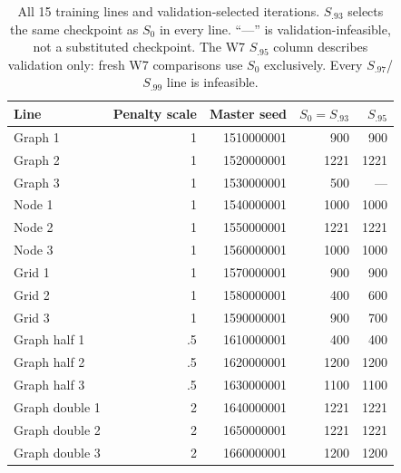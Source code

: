 \begin{table}[htbp]
\centering\small
\caption{All 15 training lines and validation-selected iterations. $S_{.93}$ selects the same checkpoint as $S_0$ in every line. ``---'' is validation-infeasible, not a substituted checkpoint. The W7 $S_{.95}$ column describes validation only: fresh W7 comparisons use $S_0$ exclusively. Every $S_{.97}$/$S_{.99}$ line is infeasible.}
\label{tab:training-roster}
\begin{tabular}{lrrrr}
\toprule
Line & Penalty scale & Master seed & $S_0=S_{.93}$ & $S_{.95}$\\
\midrule
Graph 1 &1&1510000001&900&900\\
Graph 2 &1&1520000001&1221&1221\\
Graph 3 &1&1530000001&500&---\\
Node 1 &1&1540000001&1000&1000\\
Node 2 &1&1550000001&1221&1221\\
Node 3 &1&1560000001&1000&1000\\
Grid 1 &1&1570000001&900&900\\
Grid 2 &1&1580000001&400&600\\
Grid 3 &1&1590000001&900&700\\
Graph half 1 &.5&1610000001&400&400\\
Graph half 2 &.5&1620000001&1200&1200\\
Graph half 3 &.5&1630000001&1100&1100\\
Graph double 1 &2&1640000001&1221&1221\\
Graph double 2 &2&1650000001&1221&1221\\
Graph double 3 &2&1660000001&1200&1200\\
\bottomrule
\end{tabular}
\end{table}
